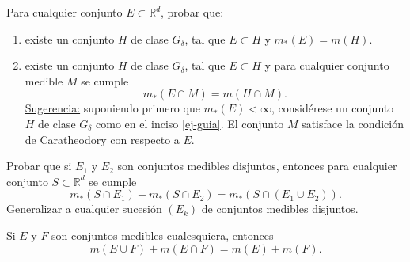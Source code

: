 \documentclass{book}
\newcommand{\rr}{\mathbb{R}}
\newcommand{\di}{\displaystyle}
\begin{document}
	
 




 \begin{ejer}{}
	 Para cualquier conjunto $E \subset \rr^d$,  probar que: 
	\begin{enumerate}
	    \item 
	    \label{ej-guia}
existe un conjunto $H$ de clase $G_{\delta}$,
  tal que $E \subset H$ y $m_*(E)=m(H)$.
  \item 
  existe un conjunto $H$ de
  clase $G_{\delta}$, tal que $E \subset H$ y para cualquier conjunto medible $M$ se cumple
  $$m_*(E \cap M)=m(H\cap M).$$
  \underline{Sugerencia:} suponiendo primero que $m_*(E)<\infty$, considérese un conjunto
  $H$ de clase $G_{\delta}$ como en el inciso \ref{ej-guia}. El conjunto $M$ satisface la
  condición de Caratheodory con respecto a $E$.
  	\end{enumerate}
	
  \end{ejer} 

   \begin{ejer}{}
	Probar que si $E_1$ y $E_2$ son conjuntos medibles disjuntos, entonces para cualquier
  conjunto $S \subset \rr^d$ se cumple 
  $$m_*(S\cap E_1)+m_*(S\cap E_2)=m_*(S\cap(E_1\cup E_2)). $$
  Generalizar a cualquier sucesión $(E_k)$ de conjuntos medibles disjuntos.
   \end{ejer} 


	 \begin{ejer}{} 
 Si $E$ y $F$ son conjuntos medibles cualesquiera, entonces
  $$m(E \cup F)+m(E \cap F)=m(E)+m(F).$$
	\end{ejer} 
\end{document}
